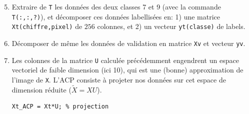 \begin{enumerate}
\setcounter{enumi}{4}
\item Extraire de \texttt{T} les données des deux classes 7 et 9 (avec la commande \texttt{T(:,:,?)}), et décomposer ces données labellisées en: 1) une matrice \texttt{Xt(chiffre,pixel)} de $256$ colonnes, et 2) un vecteur \texttt{yt(classe)} de labels.

\item Décomposer de même les données de validation en matrice \texttt{Xv} et vecteur \texttt{yv}.

\item Les colonnes de la matrice \texttt{U} calculée précédemment engendrent un espace vectoriel de faible dimension (ici 10), qui est une (bonne) approximation de l'image de \texttt{X}. L'ACP consiste à projeter nos données sur cet espace de dimension réduite ($\tilde{X} = XU$).
\begin{lstlisting}
Xt_ACP = Xt*U; % projection
\end{lstlisting}
\end{enumerate}